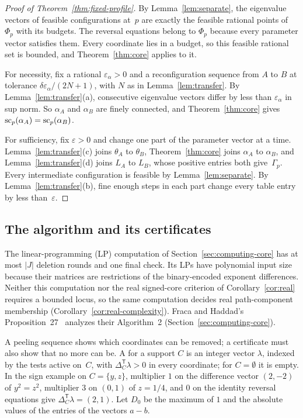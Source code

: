 \begin{proof}[Proof of Theorem~\ref{thm:fixed-profile}]
By Lemma~\ref{lem:separate}, the eigenvalue vectors of feasible
configurations at~$p$ are exactly the feasible rational points of $\Phi_p$
with its budgets. The reversal equations belong to $\Phi_p$ because every
parameter vector satisfies them. Every coordinate lies in a budget, so this
feasible rational set is bounded, and Theorem~\ref{thm:core} applies to it.

For necessity, fix a rational $\varepsilon_\alpha>0$ and a reconfiguration
sequence from $A$ to $B$ at tolerance $\delta\varepsilon_\alpha/(2N+1)$,
with $N$ as in Lemma~\ref{lem:transfer}. By Lemma~\ref{lem:transfer}(a),
consecutive eigenvalue vectors differ by less than $\varepsilon_\alpha$ in
sup norm. So $\alpha_A$ and $\alpha_B$ are finely connected, and
Theorem~\ref{thm:core} gives $\operatorname{sc}_p(\alpha_A)=\operatorname{sc}_p(\alpha_B)$.

For sufficiency, fix $\varepsilon>0$ and change one part of the parameter
vector at a time. Lemma~\ref{lem:transfer}(c) joins $\theta_A$ to
$\theta_B$, Theorem~\ref{thm:core} joins $\alpha_A$ to $\alpha_B$, and
Lemma~\ref{lem:transfer}(d) joins $L_A$ to $L_B$, whose positive entries
both give~$\Gamma_p$. Every intermediate configuration is feasible by
Lemma~\ref{lem:separate}. By Lemma~\ref{lem:transfer}(b), fine enough steps
in each part change every table entry by less than~$\varepsilon$.
\end{proof}

\subsection{The algorithm and its certificates}\label{sec:algorithm}

The linear-programming (LP) computation of Section~\ref{sec:computing-core}
has at most $|J|$ deletion rounds and one final check. Its LPs have
polynomial input size because their matrices are restrictions of the
binary-encoded exponent differences. Neither this computation nor the real
signed-core criterion of Corollary~\ref{cor:real} requires a bounded locus,
so the same computation decides real path-component membership
(Corollary~\ref{cor:real-complexity}). Fraca and Haddad's
Proposition~27~\cite{fracahaddad} analyzes their Algorithm~2
(Section~\ref{sec:computing-core}).

A peeling sequence shows which coordinates can be removed; a certificate
must also show that no more can be. A  for a
support $C$ is an integer vector $\lambda$, indexed by the tests active
on~$C$, with $\Delta_C^{\mathsf T}\lambda>0$ in every coordinate; for
$C=\emptyset$ it is empty. In the sign example on $C=\{y,z\}$, multiplier $1$ on
the difference vector $(2,-2)$ of $y^2=z^2$, multiplier $3$ on $(0,1)$ of
$z=1/4$, and $0$ on the identity reversal equations give
$\Delta_C^{\mathsf T}\lambda=(2,1)$. Let $D_0$ be the
maximum of $1$ and the absolute values of the entries of the vectors $a-b$.

